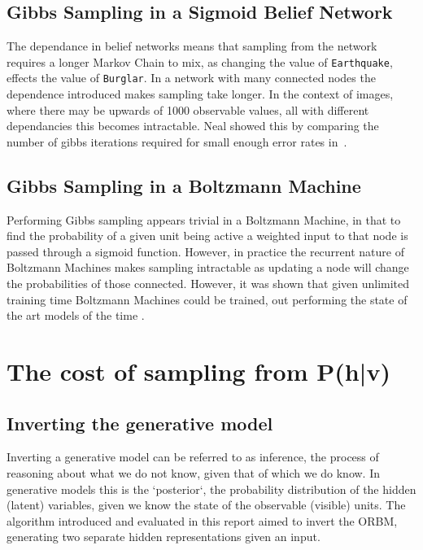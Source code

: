 \subsection{Gibbs Sampling in a Sigmoid Belief Network}

The dependance in belief networks means that sampling from the network requires a longer Markov Chain to mix, as changing the value of \texttt{Earthquake}, effects the value of \texttt{Burglar}. In a network with many connected nodes the dependence introduced makes sampling take longer. In the context of images, where there may be upwards of 1000 observable values, all with different dependancies this becomes intractable. Neal showed this by comparing the number of gibbs iterations required for small enough error rates in~\cite{neal1992:connectionist}.

\subsection{Gibbs Sampling in a Boltzmann Machine}

Performing Gibbs sampling appears trivial in a Boltzmann Machine, in that to find the probability of a given unit being active a weighted input to that node is passed through a sigmoid function. However, in practice the recurrent nature of Boltzmann Machines makes sampling intractable as updating a node will change the probabilities of those connected. However, it was shown that given unlimited training time Boltzmann Machines could be trained, out performing the state of the art models of the time .

\section{The cost of sampling from P(h|v)}

\subsection{Inverting the generative model}

Inverting a generative model can be referred to as inference, the process of reasoning about what we do not know, given that of which we do know. In generative models this is the `posterior`, the probability distribution of the hidden (latent) variables, given we know the state of the observable (visible) units. The algorithm introduced and evaluated in this report aimed to invert the ORBM, generating two separate hidden representations given an input.

